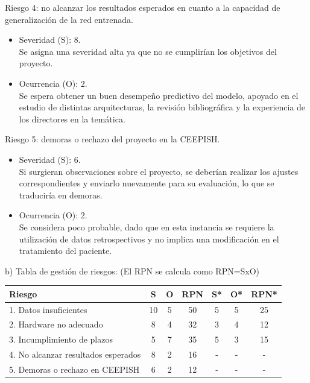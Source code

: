 \documentclass[
11pt, %
codirector, %
]{charter}
\begin{document}
Riesgo 4: no alcanzar los resultados esperados en cuanto a la capacidad de generalización de la red entrenada.
\begin{itemize}
	\item Severidad (S):  8.\\
	Se asigna una severidad alta ya que no se cumplirían los objetivos del proyecto.
	\item Ocurrencia (O): 2.\\
	Se espera obtener un buen desempeño predictivo del modelo, apoyado en el estudio de distintas arquitecturas, la revisión bibliográfica y la experiencia de los directores en la temática.
\end{itemize}

Riesgo 5: demoras o rechazo del proyecto en la CEEPISH.
\begin{itemize}
	\item Severidad (S):  6.\\
	Si surgieran observaciones sobre el proyecto, se deberían realizar los ajustes correspondientes y enviarlo nuevamente para su evaluación, lo que se traduciría en demoras. 
	\item Ocurrencia (O): 2.\\
	Se considera poco probable, dado que en esta instancia se requiere la utilización de datos retrospectivos y no implica una modificación en el tratamiento del paciente.
\end{itemize}


b) Tabla de gestión de riesgos:      (El RPN se calcula como RPN=SxO)

\begin{table}[htpb]
\centering
\begin{tabularx}{\linewidth}{@{}|X|c|c|c|c|c|c|@{}}
\hline
\rowcolor[HTML]{C0C0C0} 
Riesgo & S & O & RPN & S* & O* & RPN* \\ \hline
1. Datos insuficientes       &   10 & 5  & 50    & 5   & 5   & 25     \\ \hline
2. Hardware no adecuado       & 8  & 4  & 32    & 3   & 4   & 12     \\ \hline
3. Incumplimiento de plazos       & 5  & 7  & 35    & 5   & 3   & 15     \\ \hline
4. No alcanzar resultados esperados       & 8  & 2  &  16   & -   & -   & -     \\ \hline
5. Demoras o rechazo en CEEPISH       & 6  & 2  & 12    & -   & -   & -     \\ \hline
\end{tabularx}%
\end{table}
\end{document}
